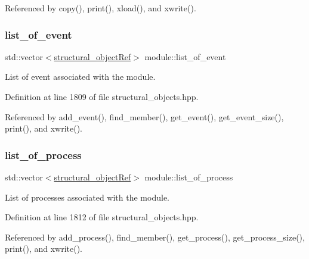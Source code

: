 Referenced by copy(), print(), xload(), and xwrite().

\mbox{\label{classmodule_a421dffcbfc875ebb774e447559f16623}} 
\subsubsection{\texorpdfstring{list\+\_\+of\+\_\+event}{list\_of\_event}}
{\footnotesize\ttfamily std\+::vector$<$\hyperlink{structural__objects_8hpp_a8ea5f8cc50ab8f4c31e2751074ff60b2}{structural\+\_\+object\+Ref}$>$ module\+::list\+\_\+of\+\_\+event\hspace{0.3cm}{\ttfamily [private]}}



List of event associated with the module. 



Definition at line 1809 of file structural\+\_\+objects.\+hpp.



Referenced by add\+\_\+event(), find\+\_\+member(), get\+\_\+event(), get\+\_\+event\+\_\+size(), print(), and xwrite().

\mbox{\label{classmodule_afc76e2f7629ee00a39914d17e6b9f6de}} 
\subsubsection{\texorpdfstring{list\+\_\+of\+\_\+process}{list\_of\_process}}
{\footnotesize\ttfamily std\+::vector$<$\hyperlink{structural__objects_8hpp_a8ea5f8cc50ab8f4c31e2751074ff60b2}{structural\+\_\+object\+Ref}$>$ module\+::list\+\_\+of\+\_\+process\hspace{0.3cm}{\ttfamily [private]}}



List of processes associated with the module. 



Definition at line 1812 of file structural\+\_\+objects.\+hpp.



Referenced by add\+\_\+process(), find\+\_\+member(), get\+\_\+process(), get\+\_\+process\+\_\+size(), print(), and xwrite().

